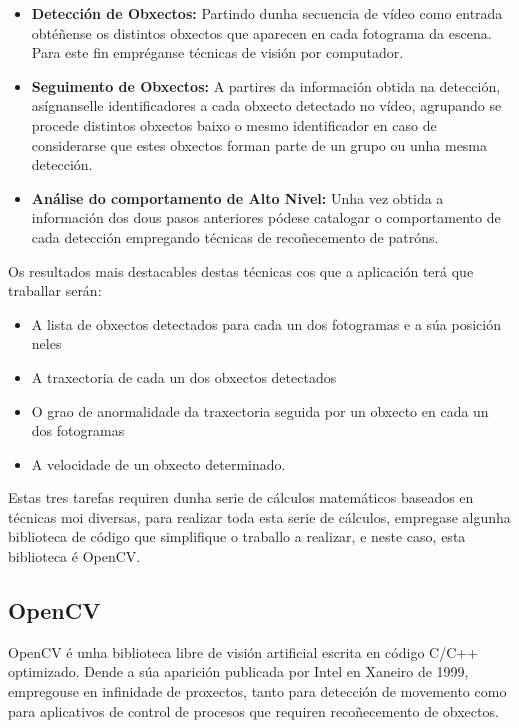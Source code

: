 	\begin{itemize}
	
		\item{\textbf{Detección de Obxectos:}} Partindo dunha secuencia de vídeo como 
		entrada obtéñense os distintos obxectos que aparecen en cada fotograma da escena.
		Para este fin empréganse técnicas de visión por computador.
		
		
		\item{\textbf{Seguimento de Obxectos:}} A partires da información obtida na detección, asígnanselle 
		identificadores a cada obxecto detectado no vídeo, agrupando se procede distintos
		obxectos baixo o mesmo identificador en caso de considerarse que estes obxectos forman
		parte de un grupo ou unha mesma detección.
		
		
		\item{\textbf{Análise do comportamento de Alto Nivel:}} Unha vez obtida a información dos 
		dous pasos anteriores pódese catalogar o comportamento de cada detección empregando
		técnicas de recoñecemento de patróns.
	
	\end{itemize}	
	
	Os resultados mais destacables destas técnicas cos que a aplicación terá que traballar serán:
	\begin{itemize}
		\item A lista de obxectos detectados para cada un dos fotogramas e a súa posición neles
		\item A traxectoria de cada un dos obxectos detectados
		\item O grao de anormalidade da traxectoria seguida por un obxecto en cada un dos fotogramas
		\item A velocidade de un obxecto determinado.
	\end{itemize}
	
	Estas tres tarefas requiren dunha serie de cálculos matemáticos baseados en técnicas moi diversas,
	para realizar toda esta serie de cálculos, empregase algunha biblioteca de código que simplifique 
	o traballo a realizar, e neste caso, esta biblioteca é OpenCV.
	
	\subsection{OpenCV}
		OpenCV é unha biblioteca libre de visión artificial escrita en código C/C++ optimizado.
		Dende a súa aparición publicada por Intel en Xaneiro de 1999, empregouse en infinidade 
		de proxectos, tanto para detección de movemento como para aplicativos de control de procesos
		que requiren recoñecemento de obxectos.
		
